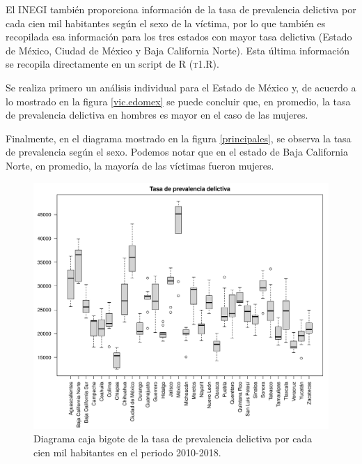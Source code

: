 \documentclass[12pt]{article}
\begin{document}
El INEGI también proporciona información de la tasa de prevalencia delictiva por cada cien mil habitantes según el sexo de la víctima, por lo que también es recopilada esa información para los tres estados con mayor tasa delictiva (Estado de México, Ciudad de México y Baja California Norte). Esta última información se recopila directamente en un script de \textsc{R} (\textsc{t1.R}). 

Se realiza primero un análisis individual para el Estado de México y, de acuerdo a lo mostrado en la figura \ref{vic.edomex} se puede concluir que, en promedio, la tasa de prevalencia delictiva en hombres es mayor en el caso de las mujeres.  

Finalmente, en el diagrama mostrado en la figura \ref{principales}, se observa la tasa de prevalencia según el sexo. Podemos notar que en el estado de Baja California Norte, en promedio, la mayoría de las víctimas fueron mujeres. 

\begin{figure}
	\centering
	\includegraphics[scale=0.5]{victimizacion.png}
	\caption{Diagrama caja bigote de la tasa de prevalencia delictiva por cada cien mil habitantes en el periodo 2010-2018.}
	\label{vic}
\end{figure}
\end{document}
